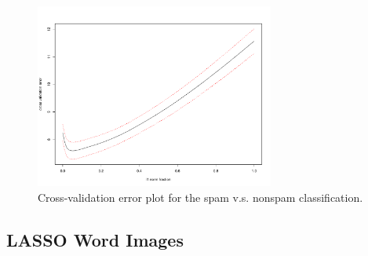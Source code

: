 \documentclass[11pt]{article}
\newcommand{\1}[1]{{\mathbf 1}\left\{#1\right\}}        %
\begin{document}
\begin{center}
\begin{figure}[!h]
   \centering
   \includegraphics[width=0.7\textwidth]{../lassoResults/CVSpamErr.pdf} 
      \caption{Cross-validation error plot for the spam v.s. nonspam classification. }
   \label{fig:cvplotspam}
\end{figure}
\end{center}

\clearpage
\newpage
\subsection{LASSO Word Images}\label{asec:lassowordimages}
\end{document}
